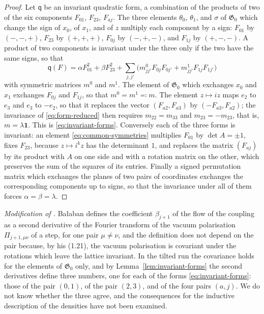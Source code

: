 \documentclass[11pt]{preprint}
\newcommand{\id}{\mathbf 1}
\numberwithin{equation}{section}
\theoremstyle{definition}
\theoremstyle{remark}
\theoremstyle{plain}
\begin{document}
\begin{proof}
Let $\mathsf q$ be an invariant quadratic form, a combination of the products of two of the six components $F_{01}$, $F_{23}$, $F_{aj}$. The three elements $\theta_0$, $\theta_1$, and $\sigma$ of $\mathfrak G_0$ which change the sign of $x_0$, of $x_1$, and of $z$ multiply each component by a sign: $F_{01}$ by $(-, -, +)$, $F_{23}$ by $(+, +, +)$, $F_{0j}$ by $(-, +, -)$, and $F_{1j}$ by $(+, -, -)$. A product of two components is invariant under the three only if the two have the same signs, so that
\begin{equation}\label{eq:form-reduced}
    \mathsf q(F) = \alpha F_{01}^2 + \beta F_{23}^2 + \sum_{j,j'}\bigl(m^0_{jj'}F_{0j}F_{0j'} + m^1_{jj'}F_{1j}F_{1j'}\bigr)
\end{equation}
with symmetric matrices $m^0$ and $m^1$. The element of $\mathfrak G_0$ which exchanges $x_0$ and $x_1$ exchanges $F_{0j}$ and $F_{1j}$, so that $m^0 = m^1 \eqqcolon m$. The element $z \mapsto iz$ maps $e_2$ to $e_3$ and $e_3$ to $-e_2$, so that it replaces the vector $(F_{a2}, F_{a3})$ by $(-F_{a3}, F_{a2})$; the invariance of \eqref{eq:form-reduced} then requires $m_{22} = m_{33}$ and $m_{23} = -m_{23}$, that is, $m = \lambda\id$. This is \eqref{eq:invariant-forms}. Conversely each of the three forms is invariant: an element \eqref{eq:common-symmetries} multiplies $F_{01}$ by $\det A = \pm1$, fixes $F_{23}$, because $z \mapsto i^kz$ has the determinant $1$, and replaces the matrix $(F_{aj})$ by its product with $A$ on one side and with a rotation matrix on the other, which preserves the sum of the squares of its entries. Finally a signed permutation matrix which exchanges the planes of two pairs of coordinates exchanges the corresponding components up to signs, so that the invariance under all of them forces $\alpha = \beta = \lambda$.
\end{proof}

\emph{Modification of \cite[(1.20)--(1.22), p.~264]{BalabanRG1}.} Ba{\l}aban defines the coefficient $\beta_{j+1}$ of the flow of the coupling as a second derivative of the Fourier transform of the vacuum polarisation $\Pi_{j+1,\mu\nu}$ of a step, for one pair $\mu \neq \nu$, and the definition does not depend on the pair because, by his (1.21), the vacuum polarisation is covariant under the rotations which leave the lattice invariant. In the tilted run the covariance holds for the elements of $\mathfrak G_0$ only, and by Lemma~\ref{lem:invariant-forms} the second derivatives define three numbers, one for each of the forms \eqref{eq:invariant-forms}: those of the pair $(0, 1)$, of the pair $(2, 3)$, and of the four pairs $(a, j)$. We do not know whether the three agree, and the consequences for the inductive description of the densities have not been examined.
\end{document}
